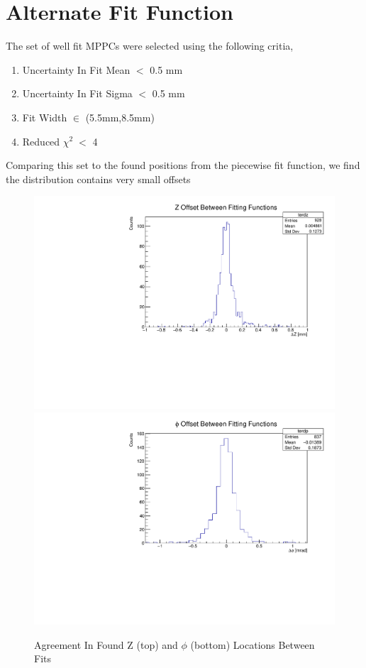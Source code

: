 \section{Alternate Fit Function}
The set of well fit MPPCs were selected using the following critia,
\begin{enumerate}
    \item Uncertainty In Fit Mean $<$ 0.5 mm
    \item Uncertainty In Fit Sigma $<$ 0.5 mm
    \item Fit Width $\in$ (5.5mm,8.5mm)
    \item Reduced $\chi ^{2} \; <$ 4
\end{enumerate}

Comparing this set to the found positions from the piecewise fit function, we find the distribution contains very small offsets

\begin{figure}[h]
    \centering
    \includegraphics[width=.7\linewidth]{graphics/terdzhc.pdf}
    \includegraphics[width=.7\linewidth]{graphics/terdphc.pdf}
    \caption{Agreement In Found Z (top) and $\phi$ (bottom) Locations Between Fits}
    \label{fig:fitcompare}
\end{figure}

